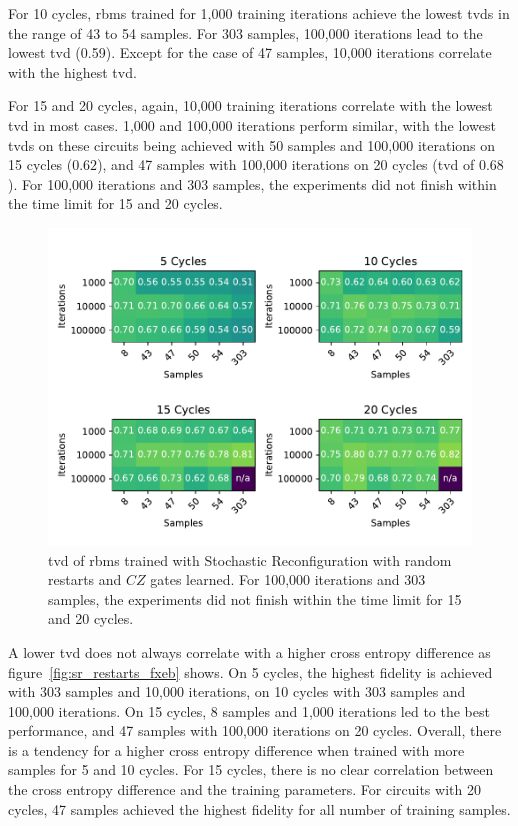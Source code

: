 For 10 cycles, \gls{rbm}s trained for 1,000 training iterations achieve the lowest \gls{tvd}s in the range of 43 to 
54 samples. For 303 samples, 100,000 iterations lead to the lowest \gls{tvd} (0.59). Except for the 
case of 47 samples, 10,000 iterations correlate with the highest \gls{tvd}.

For 15 and 20 cycles, again, 10,000 training iterations correlate with the lowest \gls{tvd} in most cases. 1,000
and 100,000 iterations perform similar, with the lowest \gls{tvd}s on these circuits being achieved with 50 samples and 
100,000 iterations on 15 cycles ($0.62$), and 47 samples with 100,000 iterations on 20 cycles (\gls{tvd} of $0.68$).
For 100,000 iterations and 303 samples, the experiments did not finish within the time limit for 15 and 20 cycles.

\begin{figure}[H]
  \centering
  \includegraphics[width=\textwidth]{figures/results/sr-restarts-learned/tvd_heatmap.pdf}
  \caption[TVD of RBMs Trained with Stochastic Reconfiguration with Random Restarts and $CZ$ Gates Learned]{
  \gls{tvd} of \gls{rbm}s trained with Stochastic Reconfiguration with random restarts and $CZ$ gates learned.
  For 100,000 iterations and 303 samples, the experiments did not finish within the time limit for 15 and 20 cycles.}
  \label{fig:sr_restarts_tvd}
\end{figure}

A lower \gls{tvd} does not always correlate with a higher cross entropy difference as figure~\ref{fig:sr_restarts_fxeb}
shows. On 5 cycles, the highest fidelity is achieved with 303 samples and 10,000 iterations, on 10 cycles 
with 303 samples and 100,000 iterations. On 15 cycles, 8 samples and 1,000 iterations led to the best performance, 
and 47 samples with 100,000 iterations on 20 cycles. Overall, there is a tendency for a higher cross entropy difference 
when trained with more samples for 5 and 10 cycles. For 15 cycles, there is no clear correlation between the 
cross entropy difference and the training parameters. For circuits with 20 cycles, 47 samples achieved the highest 
fidelity for all number of training samples.

